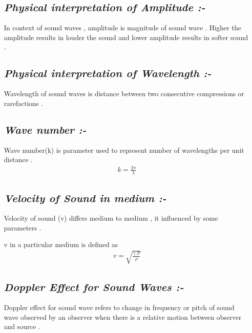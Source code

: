\documentclass[journal,12pt,twocolumn]{IEEEtran}
\theoremstyle{remark}
\begin{document}
\subsection*{\textit{Physical interpretation of Amplitude :-}}
In context of sound waves , amplitude is magnitude of sound wave . Higher the amplitude results in louder the sound and lower amplitude results in softer sound .
\subsection*{\textit{Physical interpretation of Wavelength :-}}
Wavelength of sound waves is distance between two consecutive compressions or rarefactions .
\subsection*{\textit{Wave number  :-}}
Wave number(k) is parameter used to represent number of wavelengths per unit distance .
\begin{align}k=\frac{2  \pi}{\lambda}\end{align}
\begin{table}[h!]
        
    \end{table}

\newpage
\subsection*{\textit{Velocity of Sound in medium  :-}}
Velocity of sound (v) differs medium to medium , it influenced by some parameters . 
 \begin{table}[h!]
   
        
       
    \end{table}
v in a particular medium is defined as \begin{align}v=\sqrt{\frac{\gamma  . P}{\rho}}\end{align}

\subsection*{\textit{Doppler Effect for Sound Waves :-}}
Doppler effect for sound wave refers to change in frequency or pitch of sound wave observed by an observer when there is a relative motion between observer and source .
\end{document}
